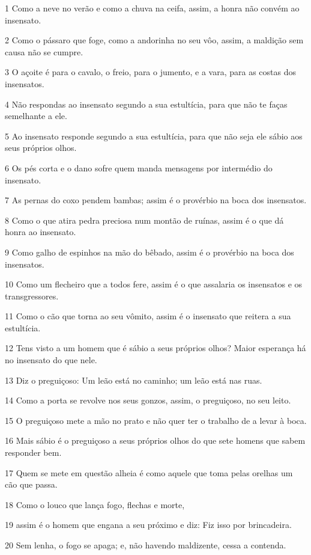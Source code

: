 \par 1 Como a neve no verão e como a chuva na ceifa, assim, a honra não convém ao insensato.
\par 2 Como o pássaro que foge, como a andorinha no seu vôo, assim, a maldição sem causa não se cumpre.
\par 3 O açoite é para o cavalo, o freio, para o jumento, e a vara, para as costas dos insensatos.
\par 4 Não respondas ao insensato segundo a sua estultícia, para que não te faças semelhante a ele.
\par 5 Ao insensato responde segundo a sua estultícia, para que não seja ele sábio aos seus próprios olhos.
\par 6 Os pés corta e o dano sofre quem manda mensagens por intermédio do insensato.
\par 7 As pernas do coxo pendem bambas; assim é o provérbio na boca dos insensatos.
\par 8 Como o que atira pedra preciosa num montão de ruínas, assim é o que dá honra ao insensato.
\par 9 Como galho de espinhos na mão do bêbado, assim é o provérbio na boca dos insensatos.
\par 10 Como um flecheiro que a todos fere, assim é o que assalaria os insensatos e os transgressores.
\par 11 Como o cão que torna ao seu vômito, assim é o insensato que reitera a sua estultícia.
\par 12 Tens visto a um homem que é sábio a seus próprios olhos? Maior esperança há no insensato do que nele.
\par 13 Diz o preguiçoso: Um leão está no caminho; um leão está nas ruas.
\par 14 Como a porta se revolve nos seus gonzos, assim, o preguiçoso, no seu leito.
\par 15 O preguiçoso mete a mão no prato e não quer ter o trabalho de a levar à boca.
\par 16 Mais sábio é o preguiçoso a seus próprios olhos do que sete homens que sabem responder bem.
\par 17 Quem se mete em questão alheia é como aquele que toma pelas orelhas um cão que passa.
\par 18 Como o louco que lança fogo, flechas e morte,
\par 19 assim é o homem que engana a seu próximo e diz: Fiz isso por brincadeira.
\par 20 Sem lenha, o fogo se apaga; e, não havendo maldizente, cessa a contenda.
